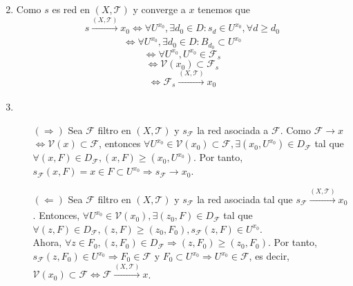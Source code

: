 \begin{dem}
  \begin{enumerate}[label=(\roman*)]
    \item []
    \item Como $s$ es red en $( X, \mathcal{T} )$ y converge a $x$ tenemos que
      \[
        s \xrightarrow[]{ ( X, \mathcal{T} ) } x_{0} \Leftrightarrow \forall U^{x_{0}}, \exists d_{0} \in D : s_{d} \in U^{x_{0}}, \forall d \geq d_{0}
      \]
      \[
        \Leftrightarrow \forall U^{x_{0}}, \exists d_{0} \in D : B_{d_{0}} \subset U^{x_{0}}
      \]
      \[ 
        \Leftrightarrow \forall U^{x_{0}}, U^{x_{0}} \in \mathcal{F}_{s}
      \] 
      \[ 
        \Leftrightarrow \mathcal{V}(x_{0})  \subset \mathcal{F}_{s}
      \] 
      \[ 
        \Leftrightarrow \mathcal{F}_{s} \xrightarrow[]{ ( X, \mathcal{T} ) } x_{0}
      \] 
    \item 
      \begin{enumerate}[label=(\roman*)]
        \item []
        \item [$(\Rightarrow)$] Sea $\mathcal{F}$ filtro en $( X, \mathcal{T} )$ y $s_{\mathcal{F}}$ la red asociada a $\mathcal{F}$. Como $\mathcal{F} \rightarrow x$ $\Leftrightarrow \mathcal{V}(x) \subset \mathcal{F}$, entonces $\forall U^{x_{0}} \in \mathcal{V}(x_{0}) \subset \mathcal{F}, \exists (x_{0}, U^{x_{0}}) \in D_{\mathcal{F}}$ tal que $\forall (x, F) \in D_{\mathcal{F}}, (x, F) \geq (x_{0}, U^{x_{0}})$. Por tanto, $s_{\mathcal{F}}(x, F) = x \in F \subset U^{x_{0}} \Rightarrow s_{\mathcal{F}} \rightarrow x_{0}$.

        \item [$(\Leftarrow)$] Sea $\mathcal{F}$ filtro en $( X, \mathcal{T} )$ y $s_{\mathcal{F}}$ la red asociada tal que $s_{\mathcal{F}} \xrightarrow[]{ ( X, \mathcal{T} ) } x_{0}$. Entonces, $\forall U^{x_{0}} \in \mathcal{V}(x_{0}), \exists (z_{0}, F) \in D_{\mathcal{F}}$ tal que $\forall (z, F) \in D_{\mathcal{F}}, (z, F) \geq (z_{0}, F_{0}), s_{\mathcal{F}}(z, F) \in U^{x_{0}}$. \\

          Ahora, $\forall z \in F_{0}, (z, F_{0}) \in D_{\mathcal{F}} \Rightarrow (z, F_{0}) \geq (z_{0}, F_{0})$. Por tanto, $s_{\mathcal{F}}(z, F_{0}) \in U^{x_{0}} \Rightarrow F_{0} \in \mathcal{F}$ y $F_{0} \subset U^{x_{0}} \Rightarrow U^{x_{0}} \in \mathcal{F}$, es decir, $\mathcal{V}(x_{0}) \subset \mathcal{F} \Leftrightarrow \mathcal{F} \xrightarrow[]{ ( X, \mathcal{T} ) } x$.
      \end{enumerate}
  \end{enumerate}
\end{dem}
